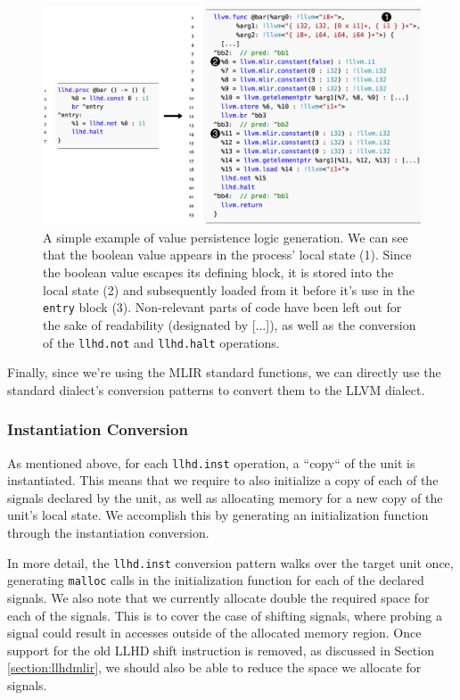 \begin{figure}
    \centering
    \includegraphics[width=\textwidth]{gfx/Persistlow.png}
    \caption[A simple example of value persistence logic generation.]{
        A simple example of value persistence logic generation. We can see that the boolean value appears in the process' local state (1). Since the boolean value escapes its defining block, it is stored into the local state (2) and subsequently loaded from it before it's use in the \texttt{entry} block (3). Non-relevant parts of code have been left out for the sake of readability (designated by [...]), as well as the conversion of the \texttt{llhd.not} and \texttt{llhd.halt} operations.
    }
    \label{fig:persistlow}
\end{figure}

Finally, since we're using the MLIR standard functions, we can directly use the standard dialect's conversion patterns to convert them to the LLVM dialect.


\subsubsection{Instantiation Conversion}
As mentioned above, for each \texttt{llhd.inst} operation, a “copy“ of the unit is instantiated. This means that we require to also initialize a copy of each of the signals declared by the unit, as well as allocating memory for a new copy of the unit's local state. We accomplish this by generating an initialization function through the instantiation conversion.

In more detail, the \texttt{llhd.inst} conversion pattern walks over the target unit once,  generating \texttt{malloc} calls in the initialization function for each of the declared signals. We also note that we currently allocate double the required space for each of the signals. This is to cover the case of shifting signals, where probing a signal could result in accesses outside of the allocated memory region. Once support for the old LLHD shift instruction is removed, as discussed in Section \ref{section:llhdmlir}, we should also be able to reduce the space we allocate for signals.

